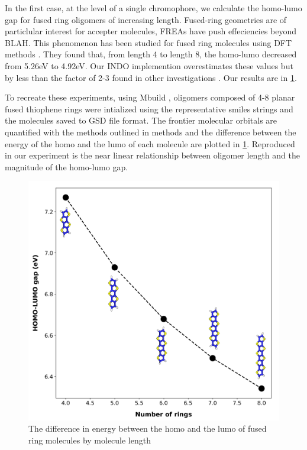 In the first case, at the level of a single chromophore, we calculate the homo-lumo gap for fused ring
oligomers of increasing length. Fused-ring geometries are of particlular interest for accepter
molecules, FREAs have push effeciencies beyond BLAH. 
This phenomenon has been studied for fused ring molecules using DFT methods \cite{Arago2010}.
They found that, from length 4 to length 8, the homo-lumo decreased from 5.26eV to 4.92eV. Our INDO implemention overestimates these values but by less than the
factor of 2-3 found in other investigations \cite{Gorelsky2001} \cite{Gorelsky2016}. 
Our results are in \ref{fig:fused}.

To recreate these experiments, using Mbuild \cite{Klein2016}, oligomers composed of 4-8 planar fused thiophene rings
were intialized using the representative smiles strings and the molecules saved to GSD file format. The frontier
molecular orbitals are quantified with the methods outlined in methods and the difference between the energy of the
homo and the lumo of each molecule are plotted in \ref{fig:fused}.
Reproduced in our experiment is the near linear relationship between oligomer length and the magnitude of the
homo-lumo gap.

\begin{figure}
  \center
  \includegraphics[width = .8\textwidth]{figures/fused-ring-figure.png}
  \caption{The difference in energy between the homo and the lumo of fused ring molecules by molecule length}
  \label{fig:fused}
\end{figure}

